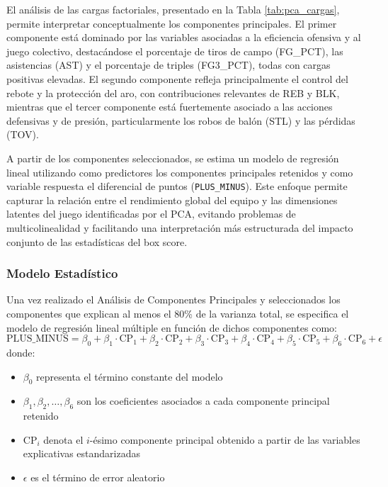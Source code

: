 \documentclass[12pt]{article}
\begin{document}
El análisis de las cargas factoriales, presentado en la Tabla \ref{tab:pca_cargas}, permite interpretar conceptualmente los componentes principales. El primer componente está dominado por las variables asociadas a la eficiencia ofensiva y al juego colectivo, destacándose el porcentaje de tiros de campo (FG\_PCT), las asistencias (AST) y el porcentaje de triples (FG3\_PCT), todas con cargas positivas elevadas. El segundo componente refleja principalmente el control del rebote y la protección del aro, con contribuciones relevantes de REB y BLK, mientras que el tercer componente está fuertemente asociado a las acciones defensivas y de presión, particularmente los robos de balón (STL) y las pérdidas (TOV).


A partir de los componentes seleccionados, se estima un modelo de regresión lineal utilizando como predictores los componentes principales retenidos y como variable respuesta el diferencial de puntos (\texttt{PLUS\_MINUS}). Este enfoque permite capturar la relación entre el rendimiento global del equipo y las dimensiones latentes del juego identificadas por el PCA, evitando problemas de multicolinealidad y facilitando una interpretación más estructurada del impacto conjunto de las estadísticas del box score.

\subsubsection{Modelo Estadístico}
\label{subsubsec:modelo-estadistico}

Una vez realizado el Análisis de Componentes Principales y seleccionados los componentes que explican al menos el 80\% de la varianza total, se especifica el modelo de regresión lineal múltiple en función de dichos componentes como:
\[
\text{PLUS\_MINUS} = \beta_0 + \beta_1 \cdot \text{CP}_1 + \beta_2 \cdot \text{CP}_2 + \beta_3 \cdot \text{CP}_3 + \beta_4 \cdot \text{CP}_4 + \beta_5 \cdot \text{CP}_5 + \beta_6 \cdot \text{CP}_6 + \epsilon
\]
donde:
\begin{itemize}
    \item $\beta_0$ representa el término constante del modelo
    \item $\beta_1, \beta_2, \ldots, \beta_6$ son los coeficientes asociados a cada componente principal retenido
    \item $\text{CP}_i$ denota el $i$-ésimo componente principal obtenido a partir de las variables explicativas estandarizadas
    \item $\epsilon$ es el término de error aleatorio
\end{itemize}
\end{document}
